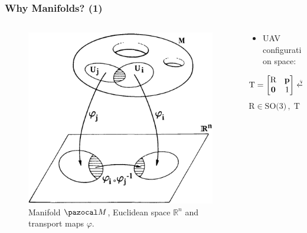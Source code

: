 \begin{frame}
	\frametitle{Why Manifolds? (1)}
	\begin{columns}
		
		\begin{column}{0.4\textwidth}\centering
			\begin{figure}[H]
				\includegraphics[width=0.9\columnwidth]{figures/manifold.png}	
				\centering
				\caption{Manifold $\Ma$, Euclidean space $\mathbb{R}^n$ and transport maps $\varphi$.\footnotemark}
				\label{fig:aerial_manip}
			\end{figure}
		\end{column}
	
	\begin{column}{0.6\textwidth}\centering
		\begin{itemize}
			\item UAV configuration space:
		\end{itemize}
		\begin{equation}			
			\text{T} = \begin{bmatrix}
			\text{R} & \textbf{p} \\
			\textbf{0} & 1
			\end{bmatrix}
			\xleftrightarrow{\varphi}
			\zeta = [x, y, z, \phi, \theta, \psi] 
		\end{equation}
		\begin{equation}
			\text{R} \in \text{SO(3)} \, , \; \text{T} \in \text{SE(3)} \, , \; \zeta \in \mathbb{R}^6 
		\end{equation}
		

\end{column}
\end{columns}
\end{frame}
